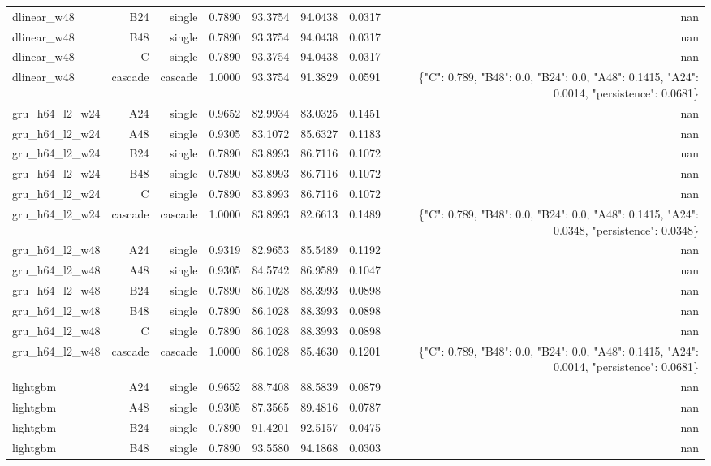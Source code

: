 \begin{table}[htbp]
\begin{tabular}{lrrrrrrr}
dlinear\_w48 & B24 & single & 0.7890 & 93.3754 & 94.0438 & 0.0317 & nan \\
dlinear\_w48 & B48 & single & 0.7890 & 93.3754 & 94.0438 & 0.0317 & nan \\
dlinear\_w48 & C & single & 0.7890 & 93.3754 & 94.0438 & 0.0317 & nan \\
dlinear\_w48 & cascade & cascade & 1.0000 & 93.3754 & 91.3829 & 0.0591 & \{"C": 0.789, "B48": 0.0, "B24": 0.0, "A48": 0.1415, "A24": 0.0014, "persistence": 0.0681\} \\
gru\_h64\_l2\_w24 & A24 & single & 0.9652 & 82.9934 & 83.0325 & 0.1451 & nan \\
gru\_h64\_l2\_w24 & A48 & single & 0.9305 & 83.1072 & 85.6327 & 0.1183 & nan \\
gru\_h64\_l2\_w24 & B24 & single & 0.7890 & 83.8993 & 86.7116 & 0.1072 & nan \\
gru\_h64\_l2\_w24 & B48 & single & 0.7890 & 83.8993 & 86.7116 & 0.1072 & nan \\
gru\_h64\_l2\_w24 & C & single & 0.7890 & 83.8993 & 86.7116 & 0.1072 & nan \\
gru\_h64\_l2\_w24 & cascade & cascade & 1.0000 & 83.8993 & 82.6613 & 0.1489 & \{"C": 0.789, "B48": 0.0, "B24": 0.0, "A48": 0.1415, "A24": 0.0348, "persistence": 0.0348\} \\
gru\_h64\_l2\_w48 & A24 & single & 0.9319 & 82.9653 & 85.5489 & 0.1192 & nan \\
gru\_h64\_l2\_w48 & A48 & single & 0.9305 & 84.5742 & 86.9589 & 0.1047 & nan \\
gru\_h64\_l2\_w48 & B24 & single & 0.7890 & 86.1028 & 88.3993 & 0.0898 & nan \\
gru\_h64\_l2\_w48 & B48 & single & 0.7890 & 86.1028 & 88.3993 & 0.0898 & nan \\
gru\_h64\_l2\_w48 & C & single & 0.7890 & 86.1028 & 88.3993 & 0.0898 & nan \\
gru\_h64\_l2\_w48 & cascade & cascade & 1.0000 & 86.1028 & 85.4630 & 0.1201 & \{"C": 0.789, "B48": 0.0, "B24": 0.0, "A48": 0.1415, "A24": 0.0014, "persistence": 0.0681\} \\
lightgbm & A24 & single & 0.9652 & 88.7408 & 88.5839 & 0.0879 & nan \\
lightgbm & A48 & single & 0.9305 & 87.3565 & 89.4816 & 0.0787 & nan \\
lightgbm & B24 & single & 0.7890 & 91.4201 & 92.5157 & 0.0475 & nan \\
lightgbm & B48 & single & 0.7890 & 93.5580 & 94.1868 & 0.0303 & nan \\

\end{tabular}
\end{table}
